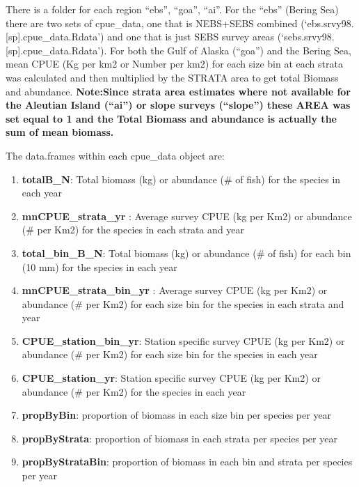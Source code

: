 \documentclass[
]{article}
\providecommand{\tightlist}{%
  \setlength{\itemsep}{0pt}\setlength{\parskip}{0pt}}
\begin{document}
There is a folder for each region ``ebs'', ``goa'', ``ai''. For the
``ebs'' (Bering Sea) there are two sets of cpue\_data, one that is
NEBS+SEBS combined (`ebs.srvy98.{[}sp{]}.cpue\_data.Rdata') and one that
is just SEBS survey areas (`sebs.srvy98.{[}sp{]}.cpue\_data.Rdata'). For
both the Gulf of Alaska (``goa'') and the Bering Sea, mean CPUE (Kg per
km2 or Number per km2) for each size bin at each strata was calculated
and then multiplied by the STRATA area to get total Biomass and
abundance. \textbf{Note:Since strata area estimates where not available
for the Aleutian Island (``ai'') or slope surveys (``slope'') these AREA
was set equal to 1 and the Total Biomass and abundance is actually the
sum of mean biomass. }

The data.frames within each cpue\_data object are:

\begin{enumerate}
\def\labelenumi{\arabic{enumi}.}
\tightlist
\item
  \textbf{totalB\_N}: Total biomass (kg) or abundance (\# of fish) for
  the species in each year\\
\item
  \textbf{mnCPUE\_strata\_yr} : Average survey CPUE (kg per Km2) or
  abundance (\# per Km2) for the species in each strata and year\\
\item
  \textbf{total\_bin\_B\_N}: Total biomass (kg) or abundance (\# of
  fish) for each bin (10 mm) for the species in each year\\
\item
  \textbf{mnCPUE\_strata\_bin\_yr} : Average survey CPUE (kg per Km2) or
  abundance (\# per Km2) for each size bin for the species in each
  strata and year
\item
  \textbf{CPUE\_station\_bin\_yr}: Station specific survey CPUE (kg per
  Km2) or abundance (\# per Km2) for each size bin for the species in
  each year\\
\item
  \textbf{CPUE\_station\_yr}: Station specific survey CPUE (kg per Km2)
  or abundance (\# per Km2) for the species in each year\\
\item
  \textbf{propByBin}: proportion of biomass in each size bin per species
  per year\\
\item
  \textbf{propByStrata}: proportion of biomass in each strata per
  species per year
\item
  \textbf{propByStrataBin}: proportion of biomass in each bin and strata
  per species per year
\end{enumerate}
\end{document}
